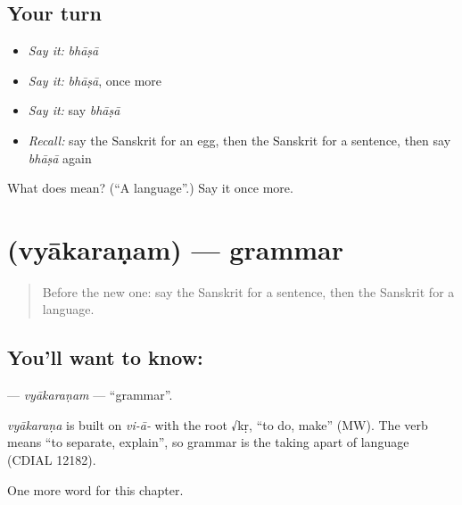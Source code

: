 \subsection*{Your turn}
\begin{itemize}
\raggedright
  \item \emph{Say it:} \emph{bhāṣā}
  \item \emph{Say it:} \emph{bhāṣā}, once more
  \item \emph{Say it:} say \emph{bhāṣā}
  \item \emph{Recall:} say the Sanskrit for an egg, then the Sanskrit for a sentence, then say \emph{bhāṣā} again
\end{itemize}

\begin{tcolorbox}[breakable,colback=teal!4,colframe=teal!35!black,title={Before you move on}]
What does  mean? (\textquotedblleft{}A language\textquotedblright{}.) Say it once more.
\end{tcolorbox}
\section[\texorpdfstring{\sk{व्याकरणम्} (vyākaraṇam)}{व्याकरणम् (vyākaraṇam)}]{ (vyākaraṇam) — grammar}

\label{lesson:SA-C199-vyakaranam}



\begin{quote}
Before the new one: say the Sanskrit for a sentence, then the Sanskrit for a language.
\end{quote}

\subsection*{You'll want to know: }
\textbf{} — \emph{vyākaraṇam} — \textquotedblleft{}grammar\textquotedblright{}.

\begin{cousinweb}
\emph{vyākaraṇa} is built on \emph{vi-ā-} with the root √kṛ, \textquotedblleft{}to do, make\textquotedblright{} (MW). The verb means \textquotedblleft{}to separate, explain\textquotedblright{}, so grammar is the taking apart of language (CDIAL 12182).
\end{cousinweb}

\begin{grammarlens}[title={What you've built}]
One more word for this chapter.
\end{grammarlens}

